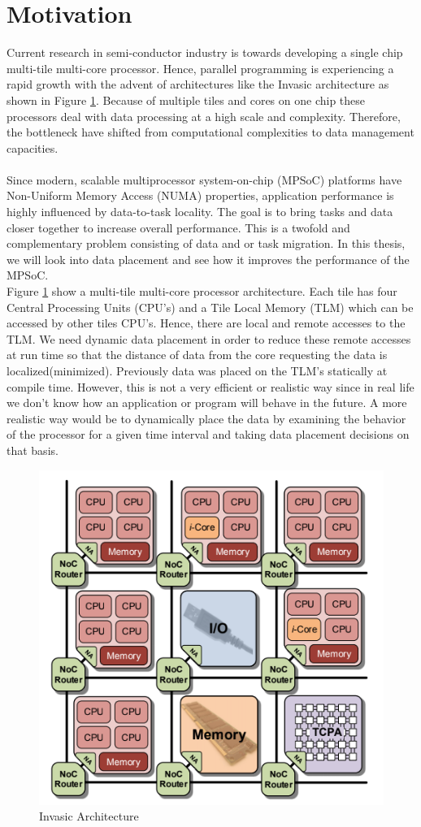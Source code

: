 \documentclass{listhesis}
\begin{document}
\section{Motivation}
Current research in semi-conductor industry is towards developing a single chip multi-tile multi-core processor. Hence, parallel programming is experiencing a rapid growth with the advent of architectures like the Invasic architecture as shown in Figure \ref{fig:multi-core,tile}. Because of multiple tiles and cores on one chip these processors deal with data processing at a high scale and complexity. Therefore, the bottleneck have shifted from computational complexities to data management capacities.\\
\\
Since modern, scalable multiprocessor system-on-chip (MPSoC) platforms have Non-Uniform Memory Access (NUMA) properties, application performance is highly influenced by data-to-task locality. The goal is to bring tasks and data closer together to increase overall performance. This is a twofold and complementary problem consisting of data and or task migration. In this thesis, we will look into data placement and see how it improves the performance of the MPSoC.\\
\newline
Figure \ref{fig:multi-core,tile} show a multi-tile multi-core processor architecture. Each tile has four Central Processing Units (CPU's) and a Tile Local Memory (TLM) which can be accessed by other tiles CPU's. Hence, there are local and remote accesses to the TLM. We need dynamic data placement in order to reduce these remote accesses at run time so that the distance of data from the core requesting the data is localized(minimized). Previously data was placed on the TLM's statically at compile time. However, this is not a very efficient or realistic way since in real life we don't know how an application or program will behave in the future. A more realistic way would be to dynamically place the data by examining the behavior of the processor for a given time interval and taking data placement decisions on that basis.
\begin{figure}
  \includegraphics[width=0.5\linewidth]{multi-core,tile.png}
  \centering
  \caption{Invasic Architecture~\cite{iNetworkAdapter}}
  \label{fig:multi-core,tile}
\end{figure}
\end{document}
